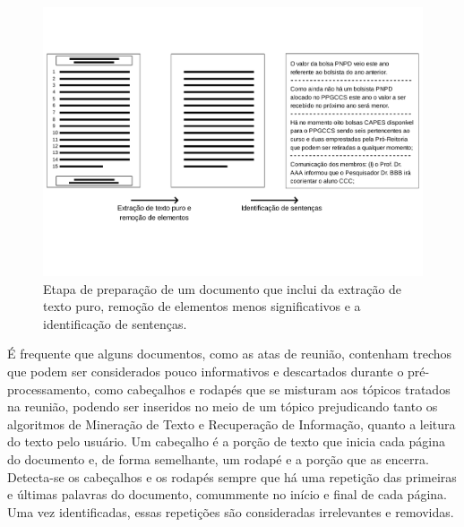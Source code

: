 \begin{center}
	\begin{figure}[h!]

		\includegraphics[trim={ 0 100 0 100 },clip,page=1,width=\textwidth]{conteudo/capitulos/figs/preparacao-docs.pdf}

		\caption{Etapa de preparação de um documento que inclui da extração de texto puro,  remoção de elementos menos significativos e a identificação de sentenças.}
		\label{fig:preprocessamento-segmentacao}
	\end{figure}
\end{center}




É frequente que alguns documentos, como as atas de reunião, contenham trechos que podem ser considerados pouco informativos e descartados durante o pré-processamento, como cabeçalhos e rodapés que se misturam aos tópicos tratados na reunião, podendo ser inseridos no meio de um tópico prejudicando tanto os algoritmos de Mineração de Texto e Recuperação de Informação, quanto a leitura do texto pelo usuário. Um cabeçalho é a porção de texto que inicia cada página do documento e, de forma semelhante, um rodapé e a porção que as encerra. Detecta-se os cabeçalhos e os rodapés sempre que há uma repetição das primeiras e últimas palavras do documento, comummente no início e final de cada página. Uma vez identificadas, essas repetições são consideradas irrelevantes e removidas.


